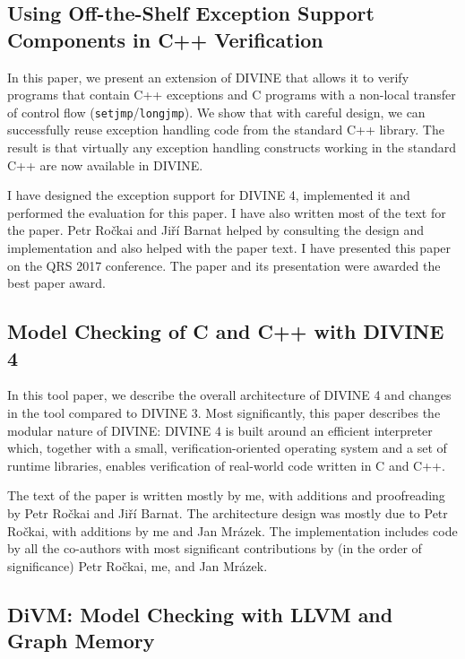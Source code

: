 \subsection*{Using Off-the-Shelf Exception Support Components in C++ Verification}

In this paper, we present an extension of DIVINE that allows it to verify programs that contain C++ exceptions and C programs with a non-local transfer of control flow (\texttt{setjmp}/\texttt{longjmp}).
We show that with careful design, we can successfully reuse exception handling code from the standard C++ library.
The result is that virtually any exception handling constructs working in the standard C++ are now available in DIVINE.

I have designed the exception support for DIVINE 4, implemented it and performed the evaluation for this paper.
I have also written most of the text for the paper.
Petr Ročkai and Jiří Barnat helped by consulting the design and implementation and also helped with the paper text.
I have presented this paper on the QRS 2017 conference.
The paper and its presentation were awarded the best paper award.

\bigskip\noindent{}

\subsection*{Model Checking of C and C++ with DIVINE 4}

In this tool paper, we describe the overall architecture of DIVINE 4 and changes in the tool compared to DIVINE 3.
Most significantly, this paper describes the modular nature of DIVINE: DIVINE 4 is built around an efficient interpreter which, together with a small, verification-oriented operating system and a set of runtime libraries, enables verification of real-world code written in C and C++.

The text of the paper is written mostly by me, with additions and proofreading by Petr Ročkai and Jiří Barnat.
The architecture design was mostly due to Petr Ročkai, with additions by me and Jan Mrázek.
The implementation includes code by all the co-authors with most significant contributions by (in the order of significance) Petr Ročkai, me, and Jan Mrázek.

\bigskip\noindent{}

\subsection*{DiVM: Model Checking with LLVM and Graph Memory}

